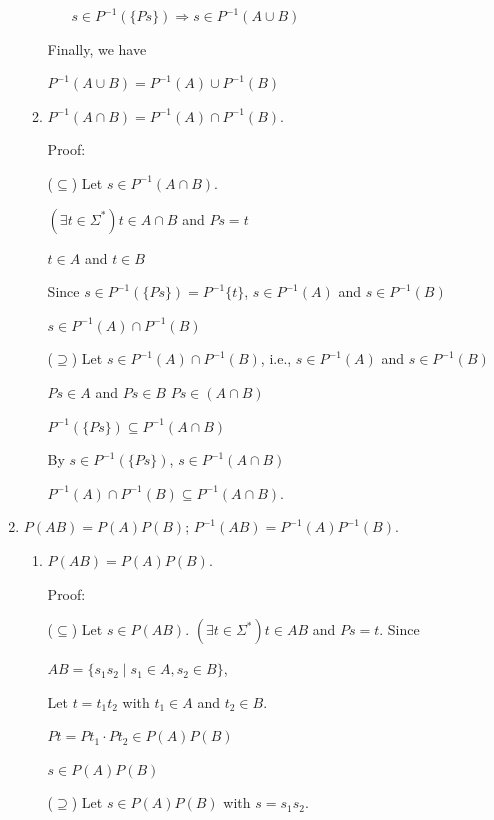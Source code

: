 \documentclass{article}
\begin{document}
\begin{enumerate}
\begin{enumerate}
\begin{itemize}
      $s \in P^{-1}(\{Ps\}) \Rightarrow s \in P^{-1}(A \cup B)$


    \end{itemize}

    Finally, we have

    $P^{-1}(A \cup B) = P^{-1}(A) \cup P^{-1}(B)$


    
    \item $P^{-1}(A \cap B) = P^{-1}(A) \cap P^{-1}(B)$.
    
    Proof:
    
    ($\subseteq$) Let $s \in P^{-1}(A \cap B)$.

    $(\exists t \in \Sigma^*) t \in A \cap B$ and $Ps = t$

    $t \in A$ and $t \in B$

    Since $s \in P^{-1}(\{Ps\}) = P^{-1}\{t\}$, $s \in P^{-1}(A)$ and $s \in P^{-1}(B)$

    $s \in P^{-1}(A) \cap P^{-1}(B)$

    ($\supseteq$) Let $s \in P^{-1}(A) \cap P^{-1}(B)$, i.e., $s \in P^{-1}(A)$ and $s \in P^{-1}(B)$

    $Ps \in A$ and $Ps \in B$ $Ps \in (A \cap B)$

    $P^{-1}(\{Ps\}) \subseteq P^{-1}(A \cap B)$

    By $s \in P^{-1}(\{Ps\})$, $s \in P^{-1}(A \cap B)$

    $P^{-1}(A) \cap P^{-1}(B) \subseteq P^{-1}(A \cap B)$.



    
  \end{enumerate}  
  \item $P(AB) = P(A)P(B)$; $P^{-1}(AB) = P^{-1}(A)P^{-1}(B)$.

  \begin{enumerate}
    \item $P(AB) = P(A)P(B)$.
    
    Proof:
    
    ($\subseteq$) Let $s \in P(AB)$. $(\exists t \in \Sigma^*) t \in AB$ and $Ps = t$. Since

    $AB = \{s_1s_2 \mid s_1 \in A, s_2 \in B\}$,

    Let $t = t_1t_2$ with $t_1 \in A$ and $t_2 \in B$.

    $Pt = Pt_1 \cdot Pt_2 \in P(A)P(B)$

    $s \in P(A)P(B)$

    ($\supseteq$) Let $s \in P(A)P(B)$ with $s = s_1s_2$.


\end{enumerate}
\end{enumerate}
\end{document}
